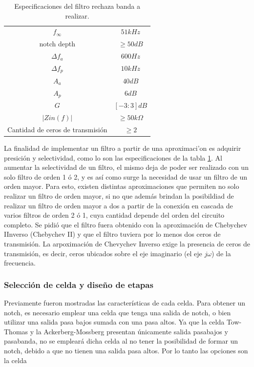 	\begin{table}[H]
	\centering
	\begin{tabular}{c c}
		\hline
		$f_\infty$ & $51kHz$ \\ 
		notch depth &  $\geq 50dB$\\
		$\Delta f_a$ & $600Hz$\\
		$\Delta f_p$ & $10kHz$\\
		$A_a$ & $40dB$\\
		$A_p$ & $6dB$\\
		$G$ & $[-3:3]dB$\\
		$|Zin(f)|$ & $\geq 50k\Omega$\\	
		Cantidad de ceros de transmisi\'on & $\geq 2$\\
		\hline
	\end{tabular}
	\caption{Especificaciones del filtro rechaza banda a realizar.}
	\label{especificaciones2}
\end{table}

La finalidad de implementar un filtro a partir de una aproximaci'on es adquirir presici\'on y selectividad, como lo son las especificaciones de la tabla \ref{especificaciones2}. Al aumentar la selectividad de un filtro, el mismo deja de poder ser realizado con un solo filtro de orden 1 \'o 2, y es as\'i como surge la necesidad de usar un filtro de un orden mayor. Para esto, existen distintas aproximaciones que permiten no solo realizar un filtro de orden mayor, si no que adem\'as brindan la posibildiad de realizar un filtro de orden mayor a dos a partir de la conexi\'on en cascada de varios filtros de orden 2 \'o 1, cuya cantidad depende del orden del circuito completo. Se pidi\'o que el filtro fuera obtenido con la aproximaci\'on de Chebychev IInverso (Chebychev II) y que el filtro tuviera por lo menos dos ceros de transmisi\'on. La arpoximaci\'on de Chevychev Inverso exige la presencia de ceros de transmisi\'on, es decir, ceros ubicados sobre el eje imaginario (el eje $j\omega$) de la frecuencia. 



\subsubsection{Selección de celda y dise\~no de etapas}
Previamente fueron mostradas las caracter\'isticas de cada celda. Para obtener un notch, es necesario emplear una celda que tenga una salida de notch, o bien utilizar una salida pasa bajos sumada con una pasa altos. Ya que la celda Tow-Thomas y la Ackerberg-Mossberg presentan únicamente salida pasabajos y pasabanda, no se empleará dicha celda al no tener la posibilidad de formar un notch, debido a que no tienen una salida pasa altos. Por lo tanto las opciones son la celda 

